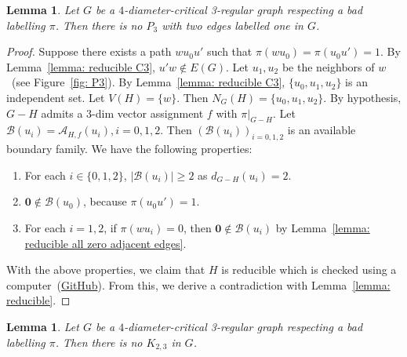 \documentclass[
final
]{dmtcs-episciences}
\newtheorem{lemma}[theorem]{Lemma}
\begin{document}
\begin{lemma}\label{lemma: reducible P3 labelled 1}
Let $G$ be a $4$-diameter-critical 3-regular graph respecting a bad labelling $\pi$.
Then there is no $P_3$ with two edges labelled one in $G$.
\end{lemma}

\begin{proof}
    Suppose  there exists a path $wu_0u'$ such that $\pi(wu_0) = \pi(u_0u') = 1$.
    By Lemma~\ref{lemma: reducible C3}, $u'w\notin E(G)$. 
    Let $u_1, u_2$ be the neighbors of $w$~(see Figure~\ref{fig: P3}).
    By Lemma~\ref{lemma: reducible C3}, $\{u_0,u_1,u_2\}$ is an independent set.
     Let $V(H)=\{w\}$. Then $N_G(H) = \{u_0, u_1,u_2\}$. By hypothesis, $G-H$ admits a $3$-dim vector assignment $f$ with $\pi|_{G-H}$.
     Let $\mathcal{B}(u_i) = \mathcal{A}_{H,f}(u_i), i=0,1,2$. Then  ${(\mathcal{B}(u_i))}_{i=0,1,2}$ is an available boundary family.
     We have the following properties:
     \begin{enumerate}
        \item For each $i\in \{0,1,2\}$, $|\mathcal{B}(u_i)| \ge 2$ as $d_{G-H}(u_i) = 2$.
         \item $\mathbf{0} \notin \mathcal{B}(u_0)$, because $\pi(u_0u') = 1$.
         \item For each $i =1,2$, if $\pi(wu_i) = 0$, then $\mathbf{0} \notin \mathcal{B}(u_i)$ by Lemma~\ref{lemma: reducible all zero adjacent edges}.
     \end{enumerate}
     With the above properties, we claim that $H$ is reducible which is checked using a computer~(\href{https://github.com/handsome12138/InversionDiameter}{GitHub}).
     From this, we derive a contradiction with Lemma~\ref{lemma: reducible}.
\end{proof}


\begin{lemma}\label{lemma: reducible K23}
Let $G$ be a $4$-diameter-critical 3-regular graph respecting a bad labelling $\pi$.
Then there is no $K_{2,3}$ in $G$.
\end{lemma}
\end{document}
